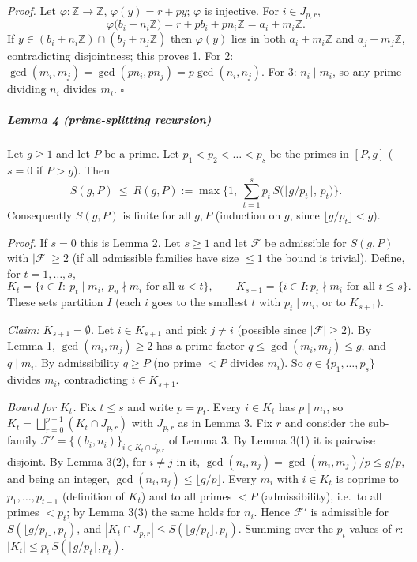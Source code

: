 \documentclass[11pt,a4paper]{article}
\begin{document}
\emph{Proof.} Let \(\varphi:\mathbb Z\to\mathbb Z\),
\(\varphi(y)=r+py\); \(\varphi\) is injective. For \(i\in J_{p,r}\),
\[\varphi\big(b_i+n_i\mathbb Z\big)=r+p b_i+p n_i\mathbb Z=a_i+m_i\mathbb Z .\]
If \(y\in (b_i+n_i\mathbb Z)\cap(b_j+n_j\mathbb Z)\) then \(\varphi(y)\)
lies in both \(a_i+m_i\mathbb Z\) and \(a_j+m_j\mathbb Z\),
contradicting disjointness; this proves 1. For 2:
\(\gcd(m_i,m_j)=\gcd(pn_i,pn_j)=p\gcd(n_i,n_j)\). For 3:
\(n_i\mid m_i\), so any prime dividing \(n_i\) divides \(m_i\).
\(\square\)

\subparagraph{Lemma 4 (prime-splitting
recursion)}\label{lemma-4-prime-splitting-recursion}

Let \(g\ge 1\) and let \(P\) be a prime. Let \(p_1<p_2<\dots<p_s\) be
the primes in \([P,g]\) (\(s=0\) if \(P>g\)). Then
\[S(g,P)\ \le\ R(g,P):=\max\Big\{1,\ \sum_{t=1}^{s} p_t\, S\big(\lfloor g/p_t\rfloor,\,p_t\big)\Big\}.\]
Consequently \(S(g,P)\) is finite for all \(g,P\) (induction on \(g\),
since \(\lfloor g/p_t\rfloor<g\)).

\emph{Proof.} If \(s=0\) this is Lemma 2. Let \(s\ge1\) and let
\(\mathcal F\) be admissible for \(S(g,P)\) with \(|\mathcal F|\ge 2\)
(if all admissible families have size \(\le1\) the bound is trivial).
Define, for \(t=1,\dots,s\),
\[K_t=\{i\in I:\ p_t\mid m_i,\ p_u\nmid m_i \text{ for all } u<t\},\qquad K_{s+1}=\{i\in I: p_t\nmid m_i \text{ for all } t\le s\}.\]
These sets partition \(I\) (each \(i\) goes to the smallest \(t\) with
\(p_t\mid m_i\), or to \(K_{s+1}\)).

\emph{Claim: \(K_{s+1}=\emptyset\).} Let \(i\in K_{s+1}\) and pick
\(j\ne i\) (possible since \(|\mathcal F|\ge2\)). By Lemma 1,
\(\gcd(m_i,m_j)\ge2\) has a prime factor \(q\le\gcd(m_i,m_j)\le g\), and
\(q\mid m_i\). By admissibility \(q\ge P\) (no prime \(<P\) divides
\(m_i\)). So \(q\in\{p_1,\dots,p_s\}\) divides \(m_i\), contradicting
\(i\in K_{s+1}\).

\emph{Bound for \(K_t\).} Fix \(t\le s\) and write \(p=p_t\). Every
\(i\in K_t\) has \(p\mid m_i\), so
\(K_t=\bigsqcup_{r=0}^{p-1}(K_t\cap J_{p,r})\) with \(J_{p,r}\) as in
Lemma 3. Fix \(r\) and consider the sub-family
\(\mathcal F'=\{(b_i,n_i)\}_{i\in K_t\cap J_{p,r}}\) of Lemma 3. By
Lemma 3(1) it is pairwise disjoint. By Lemma 3(2), for \(i\ne j\) in it,
\(\gcd(n_i,n_j)=\gcd(m_i,m_j)/p\le g/p\), and being an integer,
\(\gcd(n_i,n_j)\le\lfloor g/p\rfloor\). Every \(m_i\) with \(i\in K_t\)
is coprime to \(p_1,\dots,p_{t-1}\) (definition of \(K_t\)) and to all
primes \(<P\) (admissibility), i.e.~to all primes \(<p_t\); by Lemma
3(3) the same holds for \(n_i\). Hence \(\mathcal F'\) is admissible for
\(S(\lfloor g/p_t\rfloor,p_t)\), and
\(|K_t\cap J_{p,r}|\le S(\lfloor g/p_t\rfloor,p_t)\). Summing over the
\(p_t\) values of \(r\): \(|K_t|\le p_t\,S(\lfloor g/p_t\rfloor,p_t)\).
\end{document}
